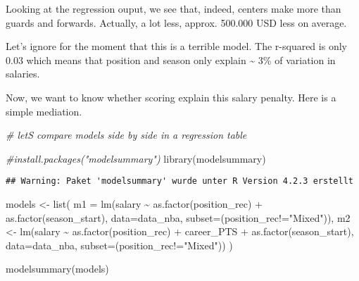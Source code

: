 \documentclass[
]{book}
\newenvironment{Shaded}{\begin{snugshade}}{\end{snugshade}}
\newcommand{\AttributeTok}[1]{\textcolor[rgb]{0.77,0.63,0.00}{#1}}
\newcommand{\CommentTok}[1]{\textcolor[rgb]{0.56,0.35,0.01}{\textit{#1}}}
\newcommand{\FunctionTok}[1]{\textcolor[rgb]{0.00,0.00,0.00}{#1}}
\newcommand{\NormalTok}[1]{#1}
\newcommand{\OtherTok}[1]{\textcolor[rgb]{0.56,0.35,0.01}{#1}}
\newcommand{\SpecialCharTok}[1]{\textcolor[rgb]{0.00,0.00,0.00}{#1}}
\newcommand{\StringTok}[1]{\textcolor[rgb]{0.31,0.60,0.02}{#1}}
\begin{document}
Looking at the regression ouput, we see that, indeed, centers make more than guards and forwards. Actually, a lot less, approx. 500.000 USD less on average.

Let's ignore for the moment that this is a terrible model. The r-squared is only 0.03 which means that position and season only explain \textasciitilde{} 3\% of variation in salaries.

Now, we want to know whether scoring explain this salary penalty. Here is a simple mediation.

\begin{Shaded}
\begin{Highlighting}[]
\CommentTok{\# let\textquotesingle{}S compare models side by side in a regression table}

\CommentTok{\#install.packages("modelsummary")}
\FunctionTok{library}\NormalTok{(modelsummary)}
\end{Highlighting}
\end{Shaded}

\begin{verbatim}
## Warning: Paket 'modelsummary' wurde unter R Version 4.2.3 erstellt
\end{verbatim}

\begin{Shaded}
\begin{Highlighting}[]
\NormalTok{models }\OtherTok{\textless{}{-}} \FunctionTok{list}\NormalTok{(}
  \AttributeTok{m1 =} \FunctionTok{lm}\NormalTok{(salary }\SpecialCharTok{\textasciitilde{}} \FunctionTok{as.factor}\NormalTok{(position\_rec) }\SpecialCharTok{+} \FunctionTok{as.factor}\NormalTok{(season\_start), }\AttributeTok{data=}\NormalTok{data\_nba, }\AttributeTok{subset=}\NormalTok{(position\_rec}\SpecialCharTok{!=}\StringTok{"Mixed"}\NormalTok{)),}
\NormalTok{  m2 }\OtherTok{\textless{}{-}} \FunctionTok{lm}\NormalTok{(salary }\SpecialCharTok{\textasciitilde{}} \FunctionTok{as.factor}\NormalTok{(position\_rec) }\SpecialCharTok{+}\NormalTok{ career\_PTS }\SpecialCharTok{+} \FunctionTok{as.factor}\NormalTok{(season\_start), }\AttributeTok{data=}\NormalTok{data\_nba, }\AttributeTok{subset=}\NormalTok{(position\_rec}\SpecialCharTok{!=}\StringTok{"Mixed"}\NormalTok{))}
\NormalTok{)}

\FunctionTok{modelsummary}\NormalTok{(models)}
\end{Highlighting}
\end{Shaded}
\end{document}
